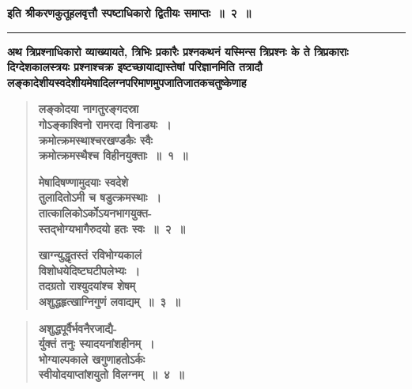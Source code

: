 \documentclass[11pt, openany]{book}
\begin{document}
\begin{center}
{\large \textbf{इति श्रीकरणकुतूहलवृत्तौ स्पष्टाधिकारो द्वितीयः समाप्तः~॥~२~॥}}\\
\vspace{2mm}

\noindent\rule{7cm}{1pt}
\end{center}
\vspace{4mm}

{\small \textbf{अथ त्रिप्रश्नाधिकारो व्याख्यायते, त्रिभिः प्रकारैः प्रश्नकथनं यस्मिन्स त्रिप्रश्नः के ते त्रिप्रकाराः दिग्देशकालस्त्रयः प्रश्नाश्चक्र इष्टच्छायाद्यास्तेषां परिज्ञानमिति तत्रादौ लङ्कादेशीयस्वदेशीयमेषादिलग्नपरिमाणमुपजातिजातकचतुष्केणाह\textendash }}

 \label{3.1}
\begin{quote}
{\large \textbf{{\color{purple}लङ्कोदया नागतुरङ्गदस्रा\\ 
गोऽङ्काश्विनो रामरदा विनाड्यः~। \\
क्रमोत्क्रमस्थाश्चरखण्डकैः स्वैः \\
क्रमोत्क्रमस्थैश्च विहीनयुक्ताः~॥~१~॥}}
\vspace{1mm}

 \label{3.2}
\textbf{{\color{purple}मेषादिषण्णामुदयाः स्वदेशे \\
तुलादितोऽमी च षडुत्क्रमस्थाः~। \\
तात्कालिकोऽर्कोऽयनभागयुक्त-\\
स्तद्भोग्यभागैरुदयो हतः स्वः~॥~२~॥}}
\vspace{1mm}

 \label{3.3}
\textbf{{\color{purple}खाग्न्युद्धृतस्तं रविभोग्यकालं\\ 
विशोधयेदिष्टघटीपलेभ्यः~। \\
तदग्रतो राश्युदयांश्च शेषम् \\
अशुद्धहृत्खाग्निगुणं लवाद्यम्~॥~३~॥}}}
\end{quote}

\newpage

 \label{3.4}
\begin{quote}
{\large \textbf{{\color{purple}अशुद्धपूर्वैर्भवनैरजाद्यै-\\
र्युक्तं तनुः स्यादयनांशहीनम्~।\\
भोग्याल्पकाले खगुणाहतोऽर्कः \\
स्वीयोदयाप्तांशयुतो विलग्नम्~॥~४~॥}}}
\end{quote}
\end{document}
